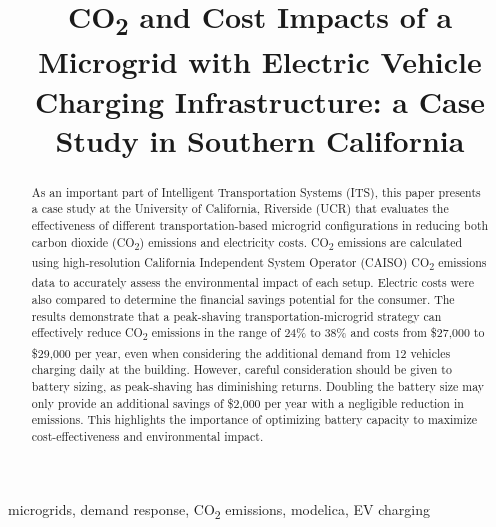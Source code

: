 \documentclass[conference]{IEEEtran}
\begin{document}
\title{CO\textsubscript{2} and Cost Impacts of a Microgrid  with Electric Vehicle \\Charging Infrastructure: a Case Study in Southern California}

\author{
}
\maketitle

\begin{abstract}
	As an important part of Intelligent Transportation Systems (ITS), this paper presents a case study at the University of California, Riverside (UCR) that evaluates the effectiveness of different transportation-based microgrid configurations in reducing both carbon dioxide (CO\textsubscript{2}) emissions and electricity costs. CO\textsubscript{2} emissions are calculated using high-resolution California Independent System Operator (CAISO) CO\textsubscript{2} emissions data to accurately assess the environmental impact of each setup. Electric costs were also compared to determine the financial savings potential for the consumer. The results demonstrate that a peak-shaving transportation-microgrid strategy can effectively reduce CO\textsubscript{2} emissions in the range of 24\% to 38\% and costs from \$27,000 to \$29,000 per year, even when considering the additional demand from 12 vehicles charging daily at the building. However, careful consideration should be given to battery sizing, as peak-shaving has diminishing returns. Doubling the battery size may only provide an additional savings of \$2,000 per year with a negligible reduction in emissions. This highlights the importance of optimizing battery capacity to maximize cost-effectiveness and environmental impact.
\end{abstract}
\begin{IEEEkeywords}
microgrids, demand response, CO\textsubscript{2} emissions, modelica, EV charging
\end{IEEEkeywords}
\end{document}
